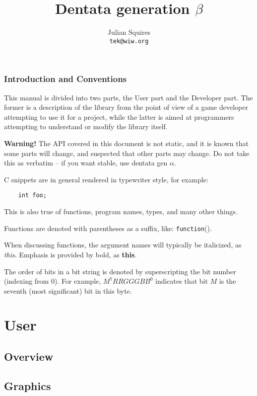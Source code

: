 \documentclass{book}
\title{Dentata generation $\beta$}
\author{Julian Squires \\ {\tt tek@wiw.org}}
\begin{document}
\maketitle
\tableofcontents
\newpage

\section{Introduction and Conventions}
\label{sec:mainintro}

This manual is divided into two parts, the User part and the Developer
part. The former is a description of the library from the point of
view of a game developer attempting to use it for a project, while the
latter is aimed at programmers attempting to understand or modify the
library itself.

{\bf Warning!} The API covered in this document is not static, and
it is known that some parts will change, and suspected that other
parts may change. Do not take this as verbatim -- if you want stable,
use dentata gen $\alpha$.

C snippets are in general rendered in typewriter style, for example:
\begin{verbatim}
    int foo;
\end{verbatim}

This is also true of functions, program names, types, and many other
things.

Functions are denoted with parentheses as a suffix, like: {\tt function}().

When discussing functions, the argument names will typically be italicized,
as {\it this}. Emphasis is provided by bold, as {\bf this}.

The order of bits in a bit string is denoted by superscripting the bit
number (indexing from 0). For example, $M^{7}RRGGGBB^0$ indicates that
bit $M$ is the seventh (most significant) bit in this byte.

\part{User}
\label{part:user}

\chapter{Overview}
\label{chap:overview}



\chapter{Graphics}
\label{chap:graphics}
\end{document}
